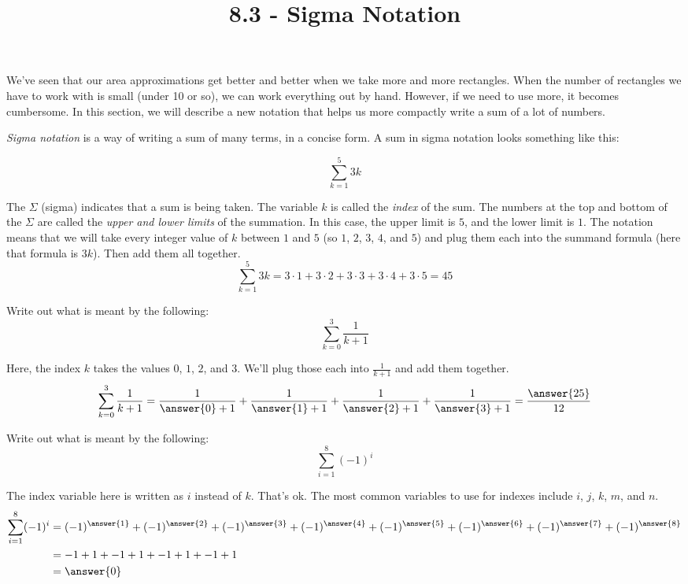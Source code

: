 \documentclass{ximera}
\title{8.3 - Sigma Notation}
\begin{document}
\begin{abstract}

\end{abstract}
\maketitle

We've seen that our area approximations get better and better when we take more 
and more rectangles.  When the number of rectangles we have to work with is small 
(under 10 or so), we can work everything out by hand.  However, if we need to use
more, it becomes cumbersome. In this section, we will describe a new notation that helps us more compactly write a sum of a lot of numbers.  

\emph{Sigma notation} is a way of writing a sum of many terms, in a concise form.  A sum in sigma notation looks something like this:

\[ \sum_{k=1}^{5} 3k \]

The $\Sigma$ (sigma) indicates that a sum is being taken.  The variable $k$ is called the \emph{index} of the sum.  The numbers at the top and bottom of the $\Sigma$
are called the \emph{upper and lower limits} of the summation.  In this case, the upper limit is $5$, and the lower limit is $1$.  The notation means that we will take
every integer value of $k$ between $1$ and $5$ (so $1$, $2$, $3$, $4$, and $5$) and plug them each into the summand formula (here that formula is $3k$).
Then add them all together.
\[ \sum_{k=1}^{5} 3k= 3\cdot 1 + 3\cdot 2 + 3\cdot 3 + 3\cdot 4 + 3\cdot 5 = 45 \]



\begin{example}
	Write out what is meant by the following:
	\[ \sum_{k=0}^{3} \frac{1}{k+1}\]
	\begin{explanation}
		Here, the index $k$ takes the values $0$, $1$, $2$, and $3$.  We'll plug those each into $\frac{1}{k+1}$ and add them together.
		\[\sum_{k=0}^3 \frac{1}{k+1} = \frac{1}{\answer{0}+1} + \frac{1}{\answer{1}+1} + \frac{1}{\answer{2}+1} + \frac{1}{\answer{3}+1} =\frac{\answer{25}}{12}\]
	\end{explanation}
\end{example}


 

\begin{example}
	Write out what is meant by the following:
	\[ \sum_{i=1}^{8} \left(-1\right)^i \]
	\begin{explanation}
		The index variable here is written as $i$ instead of $k$.  That's ok.  The most common variables to use for indexes include $i$, $j$, $k$, $m$, and $n$.
		\begin{align*}
			\sum_{i=1}^8 (-1)^i &= (-1)^{\answer{1}} + (-1)^{\answer{2}} + (-1)^{\answer{3}} + (-1)^{\answer{4}} + (-1)^{\answer{5} }+ (-1)^{\answer{6}} + (-1)^{\answer{7}} + (-1)^{\answer{8}} \\
				&= -1 + 1 + -1 + 1 + -1 + 1 + -1 + 1\\
				&= \answer{0}
		\end{align*}	
	\end{explanation}
\end{example}
 
\end{document}
